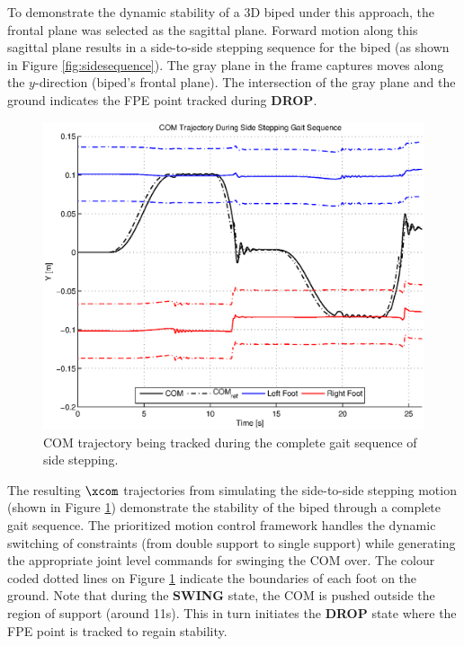 To demonstrate the dynamic stability of a 3D biped under this approach, the frontal plane was selected as the sagittal plane. Forward motion along this sagittal plane results in a side-to-side stepping sequence for the biped (as shown in Figure \ref{fig:sidesequence}). The gray plane in the frame captures moves along the $y$-direction (biped's frontal plane). The intersection of the gray plane and the ground indicates the FPE point tracked during \textbf{DROP}. 

\begin{figure}[!b]
	\centering
    \includegraphics[scale=0.7]{fig/simulations/sidecomtraj.eps}
  	\caption{COM trajectory being tracked during the complete gait sequence of side stepping.}
	\label{fig:sidecomtraj}
\end{figure}

The resulting $\xcom$ trajectories from simulating the side-to-side stepping motion (shown in Figure \ref{fig:sidecomtraj}) demonstrate the stability of the biped through a complete gait sequence. The prioritized motion control framework handles the dynamic switching of constraints (from double support to single support) while generating the appropriate joint level commands for swinging the COM over. The colour coded dotted lines on Figure \ref{fig:sidecomtraj} indicate the boundaries of each foot on the ground. Note that during the \textbf{SWING} state, the COM is pushed outside the region of support (around 11s). This in turn initiates the \textbf{DROP} state where the FPE point is tracked to regain stability.

